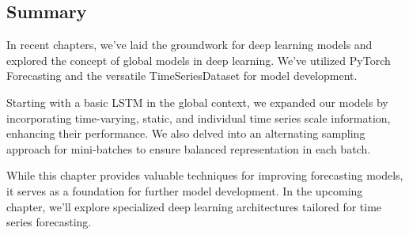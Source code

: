 \documentclass{article}
\begin{document}
\subsection{Summary}
In recent chapters, we've laid the groundwork for deep learning models and explored the concept of global models in deep learning. We've utilized PyTorch Forecasting and the versatile TimeSeriesDataset for model development.

Starting with a basic LSTM in the global context, we expanded our models by incorporating time-varying, static, and individual time series scale information, enhancing their performance. We also delved into an alternating sampling approach for mini-batches to ensure balanced representation in each batch.

While this chapter provides valuable techniques for improving forecasting models, it serves as a foundation for further model development. In the upcoming chapter, we'll explore specialized deep learning architectures tailored for time series forecasting.
\end{document}
